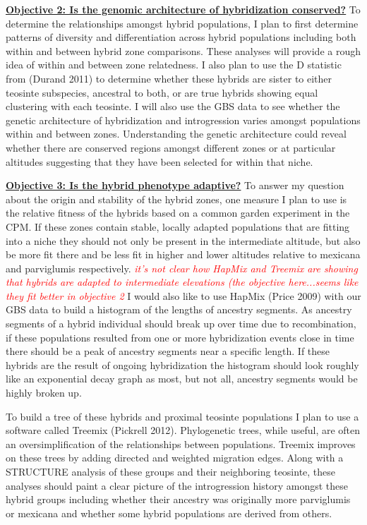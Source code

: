 \documentclass[12pt]{amsart}
\newcommand{\mbh}[1]{\textcolor{red}{ \emph{\scriptsize  #1}} }
\begin{document}
\hfill\break \textbf{\underline{Objective 2: Is the genomic architecture of hybridization conserved?} } To determine the relationships amongst hybrid populations, I plan to first determine patterns of diversity and differentiation across hybrid populations including both within and between hybrid zone comparisons.
These analyses will provide a rough idea of within and between zone relatedness.
I also plan to use the D statistic from (Durand 2011) to determine whether these hybrids are sister to either teosinte subspecies, ancestral to both, or are true hybrids showing equal clustering with each teosinte.
I will also use the GBS data to see whether the genetic architecture of hybridization and introgression varies amongst populations within and between zones.
Understanding the genetic architecture could reveal whether there are conserved regions amongst different zones or at particular altitudes suggesting that they have been selected for within that niche.

\hfill\break \textbf{\underline{Objective 3: Is the hybrid phenotype adaptive?} }To answer my question about the origin and stability of the hybrid zones, one measure I plan to use is the relative fitness of the hybrids based on a common garden experiment in the CPM. 
If these zones contain stable, locally adapted populations that are fitting into a niche they should not only be present in the intermediate altitude, but also be more fit there and be less fit in higher and lower altitudes relative to mexicana and parviglumis respectively.
\mbh{it's not clear how HapMix and Treemix are showing that hybrids are adapted to intermediate elevations (the objective here...seems like they fit better in objective 2}
I would also like to use HapMix (Price 2009) with our GBS data to build a histogram of the lengths of ancestry segments.
As ancestry segments of a hybrid individual should break up over time due to recombination, if these populations resulted from one or more hybridization events close in time there should be a peak of ancestry segments near a specific length.
If these hybrids are the result of ongoing hybridization the histogram should look roughly like an exponential decay graph as most, but not all, ancestry segments would be highly broken up.

To build a tree of these hybrids and proximal teosinte populations I plan to use a software called Treemix (Pickrell 2012).
Phylogenetic trees, while useful, are often an oversimplification of the relationships between populations. %
Treemix improves on these trees by adding directed and weighted migration edges. %
Along with a STRUCTURE analysis of these groups and their neighboring teosinte, these analyses should paint a clear picture of the introgression history amongst these hybrid groups including whether their ancestry was originally more parviglumis or mexicana and whether some hybrid populations are derived from others.
\end{document}
